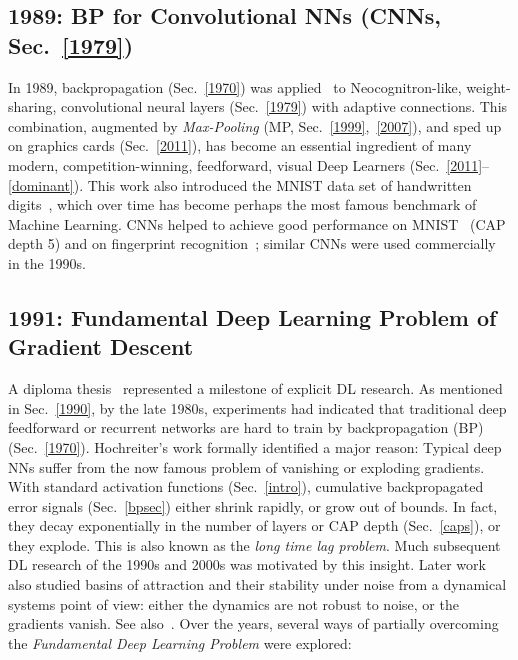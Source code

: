 \documentclass[letterpaper]{article}
\begin{document}
\begin{CJK*}{UTF8}{gbsn}
\begin{sloppypar}
\subsection{1989: BP for Convolutional NNs (CNNs, Sec.~\ref{1979})}
\label{1989}
In 1989, backpropagation (Sec.~\ref{1970}) was applied~\citep{LeCun:89,LeCun:90,LeCun:98} 
to Neocognitron-like, weight-sharing,
convolutional 
neural layers (Sec.~\ref{1979}) with adaptive connections.
This combination, augmented by {\em Max-Pooling} (MP, Sec.~\ref{1999},~\ref{2007}),
and sped up on graphics cards (Sec.~\ref{2011}),  
has become an 
essential ingredient of many modern, competition-winning, 
feedforward, visual Deep Learners (Sec.~\ref{2011}--\ref{dominant}).
This work also introduced
the MNIST data set of handwritten digits~\citep{LeCun:89}, which over time has become 
perhaps the most famous benchmark of Machine Learning. 
CNNs helped to 
achieve good performance on MNIST~\citep{LeCun:90} (CAP depth 5)
and on  fingerprint recognition~\citep{baldi93finger};
similar CNNs were used commercially in the 1990s.




\subsection{1991: Fundamental Deep Learning Problem of Gradient Descent}
\label{1991a}
 
A diploma thesis~\citep{Hochreiter:91} represented a milestone of explicit
DL research. As mentioned in Sec.~\ref{1990}, by the late 1980s, 
experiments had indicated that traditional 
deep feedforward or recurrent networks are hard to
train by backpropagation (BP) (Sec.~\ref{1970}). Hochreiter's work
formally identified a major reason: Typical deep NNs suffer from the now famous problem of vanishing or exploding gradients. With standard activation functions (Sec.~\ref{intro}), cumulative 
 backpropagated error signals (Sec.~\ref{bpsec})  either shrink rapidly, or grow out of bounds. In fact, they decay exponentially in the number of layers or CAP depth (Sec.~\ref{caps}), 
or they explode. 
This is also known as the {\em long time lag problem}.
Much subsequent DL research of the 1990s and 2000s was motivated by this insight. 
Later work~\citep{Bengio:94} also studied
basins of attraction and their stability under noise 
from a dynamical systems point of view: either the 
dynamics are not robust to noise, or the gradients vanish. See also~\citep{Hochreiter:01book,Tino03NC}.
Over the years, several ways of partially overcoming the {\em Fundamental Deep Learning Problem} were explored:


\end{sloppypar}
\end{CJK*}
\end{document}
